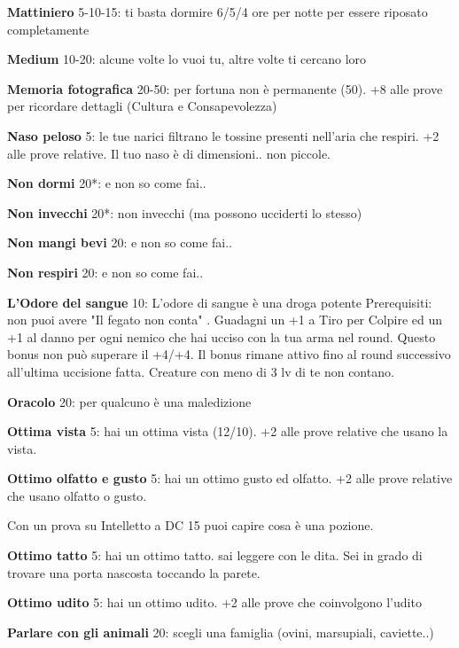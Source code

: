 \documentclass[a4paper,11pt,twoside,openany]{book}
\begin{document}
\textbf{Mattiniero} 5-10-15: ti basta dormire 6/5/4 ore per notte
per essere riposato completamente

\textbf{Medium} 10-20: alcune volte lo vuoi tu, altre volte ti cercano loro

\textbf{Memoria fotografica} 20-50: per fortuna non è permanente (50). +8 alle prove per ricordare dettagli (Cultura e Consapevolezza)

\textbf{Naso peloso} 5: le tue narici filtrano le tossine presenti nell'aria che respiri. +2 alle prove relative. Il tuo naso è di dimensioni.. non piccole.

\textbf{Non dormi} 20{*}: e non so come fai..

\textbf{Non invecchi} 20{*}: non invecchi (ma possono ucciderti lo stesso)

\textbf{Non mangi bevi} 20: e non so come fai..

\textbf{Non respiri} 20: e non so come fai..

\textbf{L'Odore del sangue} 10: L'odore di sangue è una droga potente
Prerequisiti: non puoi avere "Il fegato non conta" . Guadagni un +1 a Tiro per Colpire ed un +1 al danno per ogni nemico che hai ucciso con la tua arma nel round. Questo bonus non può superare il +4/+4. Il bonus rimane attivo fino al round successivo all'ultima uccisione fatta. Creature con meno di 3 lv di te non contano.

\textbf{Oracolo} 20: per qualcuno è una maledizione

\textbf{Ottima vista} 5: hai un ottima vista (12/10). +2 alle prove relative che usano la vista.

\textbf{Ottimo olfatto e gusto} 5: hai un ottimo gusto ed olfatto. +2 alle prove relative che usano olfatto o gusto.

Con un prova su Intelletto a DC 15 puoi capire cosa è una pozione.

\textbf{Ottimo tatto} 5: hai un ottimo tatto. sai leggere con le dita. Sei in grado di trovare una porta nascosta toccando la parete.

\textbf{Ottimo udito} 5: hai un ottimo udito. +2 alle prove che coinvolgono l'udito

\textbf{Parlare con gli animali} 20: scegli una famiglia (ovini, marsupiali, caviette..)
\end{document}
